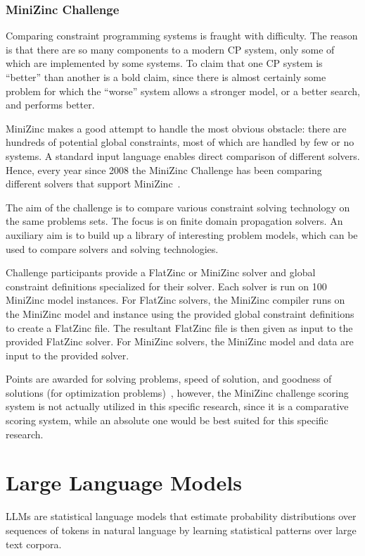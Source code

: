 \documentclass[../../main]{subfiles}
\begin{document}
\subsubsection{MiniZinc Challenge}
Comparing constraint programming systems is fraught with difficulty. The reason is that there are so many components to a modern CP system, only some of which are implemented by some systems. To claim that one CP system is ``better'' than another is a bold claim, since there is almost certainly some problem for which the ``worse'' system allows a stronger model, or a better search, and performs better.

MiniZinc makes a good attempt to handle the most obvious obstacle: there are hundreds of potential global constraints, most of which are handled by few or no systems. 
A standard input language enables direct comparison of different solvers.
Hence, every year since 2008 the MiniZinc Challenge has been comparing different solvers that support MiniZinc~\cite{PhilMznChallenge}.

The aim of the challenge is to compare various constraint solving technology on the same problems sets. The focus is on finite domain propagation solvers. An auxiliary aim is to build up a library of interesting problem models, which can be used to compare solvers and solving technologies.

Challenge participants provide a FlatZinc or MiniZinc solver and global constraint definitions specialized for their solver. Each solver is run on 100 MiniZinc model instances. For FlatZinc solvers, the MiniZinc compiler runs on the MiniZinc model and instance using the provided global constraint definitions to create a FlatZinc file. The resultant FlatZinc file is then given as input to the provided FlatZinc solver. For MiniZinc solvers, the MiniZinc model and data are input to the provided solver. 

Points are awarded for solving problems, speed of solution, and goodness of solutions (for optimization problems)~\cite{PhilMznChallenge}, however, the MiniZinc challenge scoring system is not actually utilized in this specific research, since it is a comparative scoring system, while an absolute one would be best suited for this specific research.

\section{Large Language Models}
\label{sec:LLM}
LLMs are statistical language models that estimate probability distributions over sequences of tokens in natural language by learning statistical patterns over large text corpora.
\end{document}
